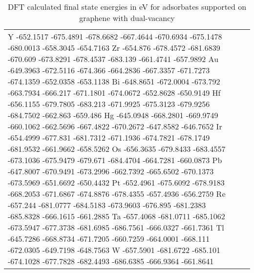 \begin{table}[h]
\begin{tabular}{lr}
      Y	  -652.1517	-675.4891	-678.6682	-667.4644	-670.6934	-675.1478	-680.0013	-658.3045	-654.7163
      Zr	-654.876	-678.4572	-681.6839	-670.609	-673.8291	-678.4537	-683.139	-661.4741	-657.9892
      Au	-649.3963	-672.5116	-674.366	-664.2836	-667.3357	-671.7273	-674.1359	-652.0358	-653.1138
      Bi	-648.8651	-672.0004	-673.792	-663.7934	-666.217	-671.1801	-674.0672	-652.8628	-650.9149
      Hf	-656.1155	-679.7805	-683.213	-671.9925	-675.3123	-679.9256	-684.7502	-662.863	-659.486
      Hg	-645.0948	-668.2801	-669.9749	-660.1062	-662.5696	-667.4822	-670.2672	-647.8582	-646.7652
      Ir	-654.4999	-677.831	-681.7312	-671.1936	-674.7821	-678.1749	-681.9532	-661.9662	-658.5262
      Os	-656.3635	-679.8433	-683.4557	-673.1036	-675.9479	-679.671	-684.4704	-664.7281	-660.0873
      Pb	-647.8007	-670.9491	-673.2996	-662.7392	-665.6502	-670.1373	-673.5969	-651.6692	-650.4432
      Pt	-652.4961	-675.6092	-678.9183	-668.2053	-671.6867	-674.8876	-678.4355	-657.4936	-656.2759
      Re	-657.244	-681.0777	-684.5183	-673.9603	-676.895	-681.2383	-685.8328	-666.1615	-661.2885
      Ta	-657.4068	-681.0711	-685.1062	-673.5947	-677.3738	-681.6985	-686.7561	-666.0327	-661.7361
      Tl	-645.7286	-668.8734	-671.7205	-660.7259	-664.0001	-668.111	-672.0305	-649.7198	-648.7563
      W	  -657.5901	-681.6722	-685.101	-674.1028	-677.7828	-682.4493	-686.6385	-666.9364	-661.8641
      \hline
    \end{tabular}
    \caption{DFT calculated final state energies in eV for adsorbates supported on graphene with dual-vacancy}
    \label{si_table6}
\end{table}


